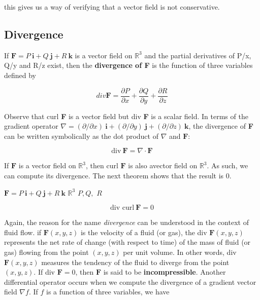 \documentclass{article}
\begin{document}
this gives us a way of verifying that a vector field is not conservative.

\subsection{Divergence}

If $\mathbf{F} = P \ \mathbf{i} + Q \ \mathbf{j} + R \ \mathbf{k} $ is a vector field on $\mathbb{R}^3$ and the partial derivatives of P/x, Q/y and R/z exist, then the \textbf{divergence of F} is the function of three variables defined by 

\begin{equation*}
    div \mathbf{F} = \frac{\partial P}{\partial x} + \frac{\partial Q}{\partial y} + \frac{\partial R}{\partial z}
\end{equation*}

Observe that curl \textbf{F} is a vector field but div \textbf{F} is a scalar field. In terms of the gradient operator $\nabla = (\partial/\partial x) \ \mathbf{i} + (\partial / \partial y) \ \mathbf{j}+ (\partial / \partial z) \ \mathbf{k}$, the divergence of \textbf{F} can be written symbolically as the dot product of $\nabla$ and $\mathbf{F}$:

\begin{equation*}
    \text{div} \  \mathbf{F} = \nabla \cdot \mathbf{F}
\end{equation*}

If $\mathbf{F}$ is a vector field on $\mathbb{R}^3$, then curl $\mathbf{F}$ is also avector field on $\mathbb{R}^3$. As such, we can compute its divergence. The next theorem shows that the result is 0.

\begin{center}
     $\mathbf{F} = P \ \mathbf{i} + Q \ \mathbf{j} + R \ \mathbf{k}$  $\mathbb{R}^3 $  $P, Q, $ $R $ 
\end{center}

\begin{equation*}
    \text{div curl} \ \mathbf{F} = 0
\end{equation*}

Again, the reason for the name \textit{divergence} can be understood in the context of fluid flow. if $\mathbf{F}(x,y,z)$ is the velocity of a fluid (or gas), the div $\mathbf{F}(x,y,z)$ represents the net rate of change (with respect to time) of the mass of fluid (or gas) flowing from the point $(x,y,z)$ per unit volume. In other words, div $\mathbf{F}(x,y,z)$ measures the tendency of the fluid to diverge from the point $(x,y,z)$. If div $\mathbf{F} = 0$, then $\mathbf{F}$ is said to be \textbf{incompressible}. Another differential operator occurs when we compute the divergence of a gradient vector field $\nabla f$. If $f$ is a function of three variables, we have 
\end{document}
